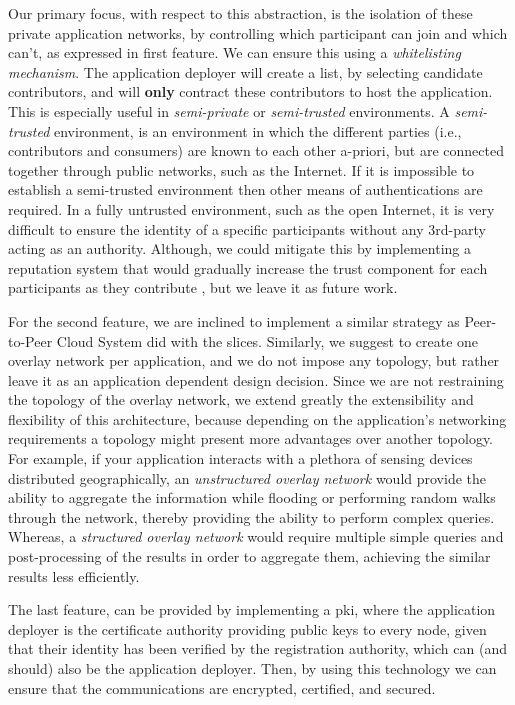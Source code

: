 \documentclass[12pt, titlepage]{uo_temp}
\begin{document}
     Our primary focus, with respect to this abstraction, is the isolation of these
     private application networks, by controlling which participant can join and which
     can't, as expressed in first feature. We can ensure this using a \emph{whitelisting
       mechanism}. The application deployer will create a list, by selecting candidate
     contributors, and will \textbf{only} contract these contributors to host the
     application. This is especially useful in \emph{semi-private} or \emph{semi-trusted}
     environments. A \emph{semi-trusted} environment, is an environment in which the
     different parties (i.e., contributors and consumers) are known to each other
     a-priori, but are connected together through public networks, such as the
     Internet. If it is impossible to establish a semi-trusted environment then other
     means of authentications are required. In a fully untrusted environment, such as the
     open Internet, it is very difficult to ensure the identity of a specific participants
     without any 3rd-party acting as an authority. Although, we could mitigate this by
     implementing a reputation system that would gradually increase the trust component
     for each participants as they contribute \cite{jin2010unstructured}, but we leave it as
     future work.
     
     For the second feature, we are inclined to implement a similar strategy as
     Peer-to-Peer Cloud System did with the slices. Similarly, we suggest to create one
     overlay network per application, and we do not impose any topology, but rather leave
     it as an application dependent design decision. Since we are not restraining the
     topology of the overlay network, we extend greatly the extensibility and flexibility
     of this architecture, because depending on the application's networking requirements
     a topology might present more advantages over another topology. For example, if your
     application interacts with a plethora of sensing devices distributed geographically,
     an \emph{unstructured overlay network} would provide the ability to aggregate the
     information while flooding or performing random walks through the network, thereby
     providing the ability to perform complex queries. Whereas, a \emph{structured overlay
       network} would require multiple simple queries and post-processing of the results
     in order to aggregate them, achieving the similar results less efficiently.

     The last feature, can be provided by implementing a \gls{pki}, where the application
     deployer is the certificate authority providing public keys to every node, given that
     their identity has been verified by the registration authority, which can (and
     should) also be the application deployer. Then, by using this technology we can
     ensure that the communications are encrypted, certified, and secured.
\end{document}
